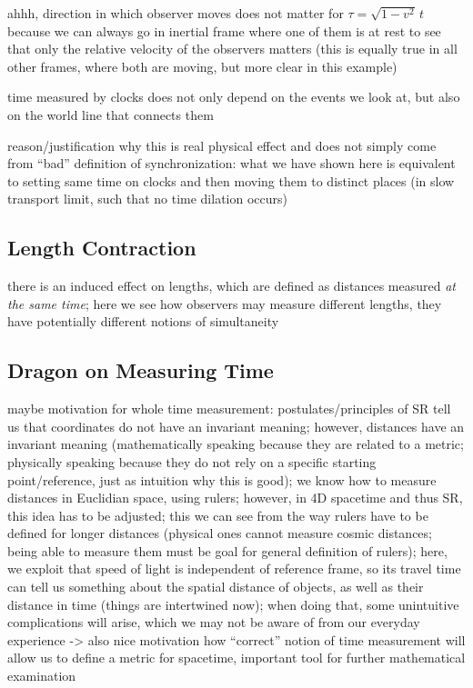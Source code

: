 ahhh, direction in which observer moves does not matter for $\tau = \sqrt{1 - v^2} \, t$ because we can always go in inertial frame where one of them is at rest to see that only the relative velocity of the observers matters (this is equally true in all other frames, where both are moving, but more clear in this example)


time measured by clocks does not only depend on the events we look at, but also on the world line that connects them


reason/justification why this is real physical effect and does not simply come from \enquote{bad} definition of synchronization: what we have shown here is equivalent to setting same time on clocks and then moving them to distinct places (in slow transport limit, such that no time dilation occurs)



		\subsection{Length Contraction}
there is an induced effect on lengths, which are defined as distances measured \emph{at the same time}; here we see how observers may measure different lengths, they have potentially different notions of simultaneity





		\subsection{Dragon on Measuring Time}
maybe motivation for whole time measurement: postulates/principles of SR tell us that coordinates do not have an invariant meaning; however, distances have an invariant meaning (mathematically speaking because they are related to a metric; physically speaking because they do not rely on a specific starting point/reference, just as intuition why this is good); we know how to measure distances in Euclidian space, using rulers; however, in 4D spacetime and thus SR, this idea has to be adjusted; this we can see from the way rulers have to be defined for longer distances (physical ones cannot measure cosmic distances; being able to measure them must be goal for general definition of rulers); here, we exploit that speed of light is independent of reference frame, so its travel time can tell us something about the spatial distance of objects, as well as their distance in time (things are intertwined now); when doing that, some unintuitive complications will arise, which we may not be aware of from our everyday experience -> also nice motivation how \enquote{correct} notion of time measurement will allow us to define a metric for spacetime, important tool for further mathematical examination



